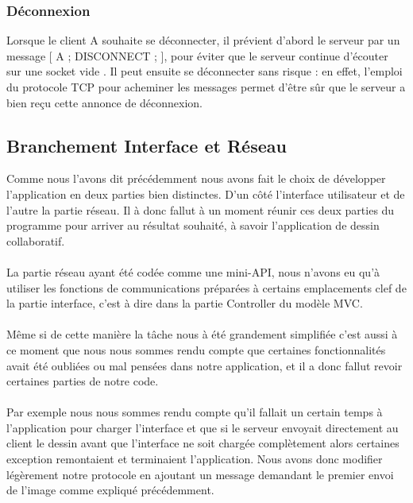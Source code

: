 \documentclass[a4paper,11pt]{article}
\begin{document}
\subsubsection{Déconnexion}
Lorsque le client A souhaite se déconnecter, il prévient d'abord le serveur par un message [ A ; DISCONNECT ; ], pour éviter que le serveur continue d'écouter sur une socket \og vide \fg. Il peut ensuite se déconnecter sans risque : en effet, l'emploi du protocole TCP pour acheminer les messages permet d'être sûr que le serveur a bien reçu cette annonce de déconnexion.

\subsection{Branchement Interface et Réseau}
Comme nous l'avons dit précédemment nous avons fait le choix de développer l'application en deux parties bien distinctes. D'un côté l'interface utilisateur et de l'autre la partie réseau. Il à donc fallut à un moment réunir ces deux parties du programme pour arriver au résultat souhaité, à savoir l'application de dessin collaboratif.

\paragraph{}La partie réseau ayant été codée comme une mini-API, nous n'avons eu qu'à utiliser les fonctions de communications préparées à certains emplacements clef de la partie interface, c'est à dire dans la partie Controller du modèle MVC.

\paragraph{} Même si de cette manière la tâche nous à été grandement simplifiée c'est aussi à ce moment que nous nous sommes rendu compte que certaines fonctionnalités avait été oubliées ou mal pensées dans notre application, et il a donc fallut revoir certaines parties de notre code.

\paragraph{} Par exemple nous nous sommes rendu compte qu'il fallait un certain temps à l'application pour charger l'interface et que si le serveur envoyait directement au client le dessin avant que l'interface ne soit chargée complètement alors certaines exception remontaient et terminaient l'application. Nous avons donc modifier légèrement notre protocole en ajoutant un message demandant le premier envoi de l'image comme expliqué précédemment.
\end{document}
